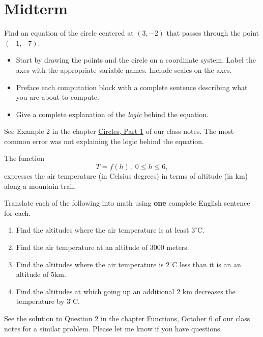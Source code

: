 \documentclass{ximera}
\begin{document}
\section{Midterm}

\begin{question} \label{Qerf300v}
Find an equation of the circle centered at $(3,-2)$ that passes through the point $(-1,-7)$. 

\begin{itemize}
\item Start by drawing the points and the circle on a coordinate system. Label the axes with the appropriate variable names. Include scales on the axes.

\item Preface each computation block with a complete sentence describing what you are about to compute.

\item Give a complete explanation of the \emph{logic} behind the equation.

\end{itemize}

\begin{explanation}
See Example 2 in the chapter \href{https://ximera.osu.edu/precalc1/PreCalculus1/Circles/Circles}{Circles, Part 1} of our class notes. The most common error was not explaining the logic behind the equation.
\end{explanation}
\end{question}


\begin{question}  \label{Qpvef3}
The function 
\[
      T = f(h) \, , \, 0\leq h \leq 6 ,
\] 
expresses the air temperature (in Celsius degrees) in terms of altitude (in km) along a mountain trail.

Translate each of the following into math using {\bf one} complete English sentence for each.

\begin{enumerate}
\item Find the altitudes where the air temperature is at least $3^\circ$C.

\item Find the air temperature at an altitude of $3000$ meters.

\item Find the altitudes where the air temperature is $2^\circ$C less than it is an an altitude of $5$km.

\item Find the altitudes at which going up an additional $2$ km decreases the temperature by $3^\circ$C.

\end{enumerate}

\begin{explanation}
See the solution to Question 2 in the chapter \href{https://ximera.osu.edu/precalc1/PreCalculus1/Functions106/Functions106}{Functions, October 6} of our class notes for a similar problem. Please let me know if you have questions.
\end{explanation}
\end{question}
\end{document}
